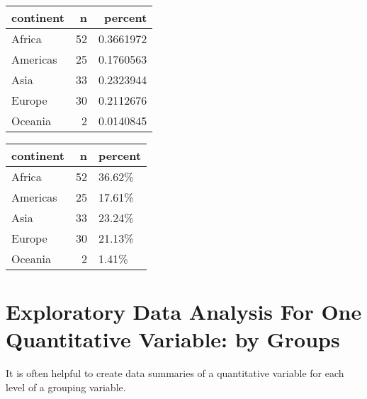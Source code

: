 \documentclass[
]{book}
\newenvironment{Shaded}{\begin{snugshade}}{\end{snugshade}}
\newcommand{\CommentTok}[1]{\textcolor[rgb]{0.56,0.35,0.01}{\textit{#1}}}
\newcommand{\DataTypeTok}[1]{\textcolor[rgb]{0.13,0.29,0.53}{#1}}
\newcommand{\DecValTok}[1]{\textcolor[rgb]{0.00,0.00,0.81}{#1}}
\newcommand{\KeywordTok}[1]{\textcolor[rgb]{0.13,0.29,0.53}{\textbf{#1}}}
\newcommand{\NormalTok}[1]{#1}
\newcommand{\OperatorTok}[1]{\textcolor[rgb]{0.81,0.36,0.00}{\textbf{#1}}}
\newcommand{\OtherTok}[1]{\textcolor[rgb]{0.56,0.35,0.01}{#1}}
\newcommand{\StringTok}[1]{\textcolor[rgb]{0.31,0.60,0.02}{#1}}
\begin{document}
\begin{tabular}{l|r|r}
\hline
continent & n & percent\\
\hline
Africa & 52 & 0.3661972\\
\hline
Americas & 25 & 0.1760563\\
\hline
Asia & 33 & 0.2323944\\
\hline
Europe & 30 & 0.2112676\\
\hline
Oceania & 2 & 0.0140845\\
\hline
\end{tabular}

\begin{Shaded}
\end{Shaded}

\begin{tabular}{l|r|l}
\hline
continent & n & percent\\
\hline
Africa & 52 & 36.62\%\\
\hline
Americas & 25 & 17.61\%\\
\hline
Asia & 33 & 23.24\%\\
\hline
Europe & 30 & 21.13\%\\
\hline
Oceania & 2 & 1.41\%\\
\hline
\end{tabular}

\hypertarget{exploratory-data-analysis-for-one-quantitative-variable-by-groups}{%
\chapter{Exploratory Data Analysis For One Quantitative Variable: by Groups}\label{exploratory-data-analysis-for-one-quantitative-variable-by-groups}}

It is often helpful to create data summaries of a quantitative variable for each level of a grouping variable.
\end{document}
